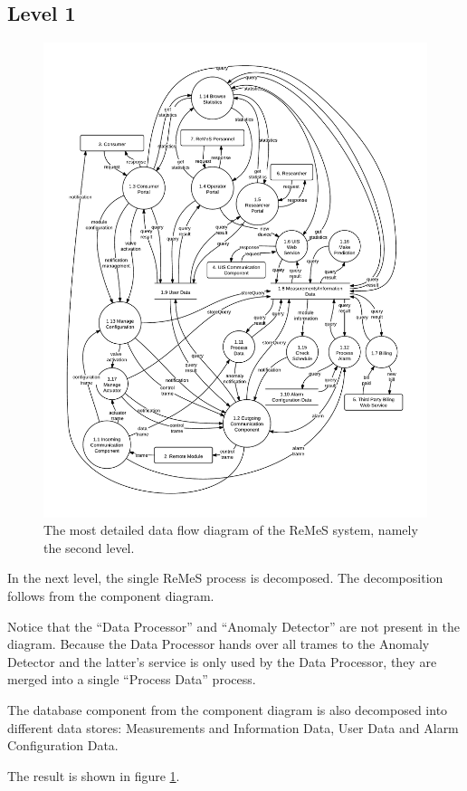 \subsection{Level 1}

\begin{figure}[h!]
	\begin{centering}
		\includegraphics[width=\textwidth]{figs/level-1.pdf}
		\caption{The most detailed data flow diagram of the ReMeS system, namely the
		second level.}
		\label{fig:data-flow-diagram-lvl2}
	\end{centering}
\end{figure}

\npar In the next level, the single ReMeS process is decomposed. The
decomposition follows from the component diagram. 

\npar Notice that the ``Data Processor'' and ``Anomaly Detector'' are not
present in the diagram. Because the Data Processor hands over all trames 
to the Anomaly Detector and the latter's service is only used by the Data
Processor, they are merged into a single ``Process Data'' process.

\npar The database component from the component diagram is also decomposed into
different data stores: Measurements and Information Data, User Data and Alarm
Configuration Data.

\npar The result is shown in figure \ref{fig:data-flow-diagram-lvl2}.



